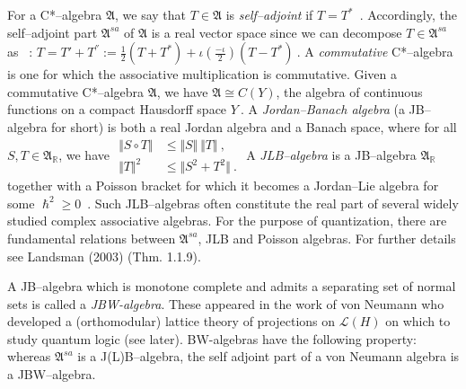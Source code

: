 \documentclass[12pt]{article}
\theoremstyle{plain}
\theoremstyle{definition}
\numberwithin{equation}{section}
\newcommand{\bR}{\mathbb{R}}
\newcommand{\med}{\medbreak}
\begin{document}
For a C*--algebra $\mathfrak A$, we say that $T \in \mathfrak A$ is \emph{self--adjoint} if $T %
= T^*$~. Accordingly, the self--adjoint part $\mathfrak A^{sa}$ of $\mathfrak A$ is a real %
vector space since we can decompose $T \in \mathfrak A^{sa}$ as ~:
\bigbreak
$ T = T' + T^{''} := \frac{1}{2} (T + T^*) + \iota (\frac{-\iota}{2})(T - T^*)~.$
\bigbreak
 A \emph{commutative} C*--algebra is one for which the associative multiplication is %
commutative. Given a commutative C*--algebra $\mathfrak A$, we have $\mathfrak A \cong C(Y)$, %
the algebra of continuous functions on a compact Hausdorff space $Y~$.
 \med
A \emph{Jordan--Banach algebra} (a JB--algebra for short) is both a real Jordan algebra and a %
Banach space, where for all $S, T \in \mathfrak A_{\bR}$, we have 
\bigbreak
$ \begin{aligned} \Vert S \circ T \Vert &\leq \Vert S \Vert ~ \Vert T \Vert ~, \\ \Vert T %
\Vert^2 &\leq \Vert S^2 + T^2 \Vert ~. \end{aligned}$
\bigbreak
A \emph{JLB--algebra} is a JB--algebra $\mathfrak A_{\bR}$ together with a Poisson bracket for %
which it becomes a Jordan--Lie algebra for some $\hslash^2 \geq 0$~. Such  JLB--algebras often %
constitute the real part of several widely studied complex associative algebras.
\bigbreak
For the purpose of quantization, there are fundamental relations between $\mathfrak A^{sa}$, %
JLB and Poisson algebras. 
\med
\bigbreak
For further details see Landsman (2003) (Thm. 1.1.9).

\med
\bigbreak
A JB--algebra which is monotone complete and admits a separating set of normal sets is 
called a \emph{JBW-algebra}. These appeared in the work of von Neumann who developed a 
(orthomodular) lattice theory of projections on $\mathcal L(H)$ on which to study quantum 
logic (see later). BW-algebras have the following property: whereas $\mathfrak A^{sa}$ is a 
J(L)B--algebra, the self adjoint part of a von Neumann algebra is a JBW--algebra.
\end{document}
